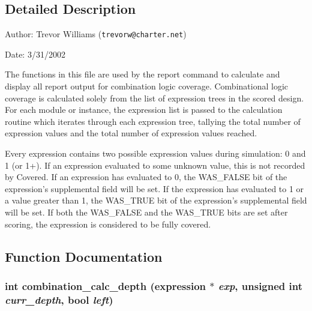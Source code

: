 \subsection{Detailed Description}
\begin{Desc}
\item[Author:]Trevor Williams ({\tt trevorw@charter.net}) \end{Desc}
\begin{Desc}
\item[Date:]3/31/2002\end{Desc}
\begin{Desc}
\item[]The functions in this file are used by the report command to calculate and display all report output for combination logic coverage. Combinational logic coverage is calculated solely from the list of expression trees in the scored design. For each module or instance, the expression list is passed to the calculation routine which iterates through each expression tree, tallying the total number of expression values and the total number of expression values reached.\end{Desc}
\begin{Desc}
\item[]Every expression contains two possible expression values during simulation: 0 and 1 (or 1+). If an expression evaluated to some unknown value, this is not recorded by Covered. If an expression has evaluated to 0, the WAS\_\-FALSE bit of the expression's supplemental field will be set. If the expression has evaluated to 1 or a value greater than 1, the WAS\_\-TRUE bit of the expression's supplemental field will be set. If both the WAS\_\-FALSE and the WAS\_\-TRUE bits are set after scoring, the expression is considered to be fully covered.\end{Desc}


\subsection{Function Documentation}
\subsubsection{\setlength{\rightskip}{0pt plus 5cm}int combination\_\-calc\_\-depth ({\bf expression} $\ast$ {\em exp}, unsigned int {\em curr\_\-depth}, {\bf bool} {\em left})}\label{comb_8c_a5}


